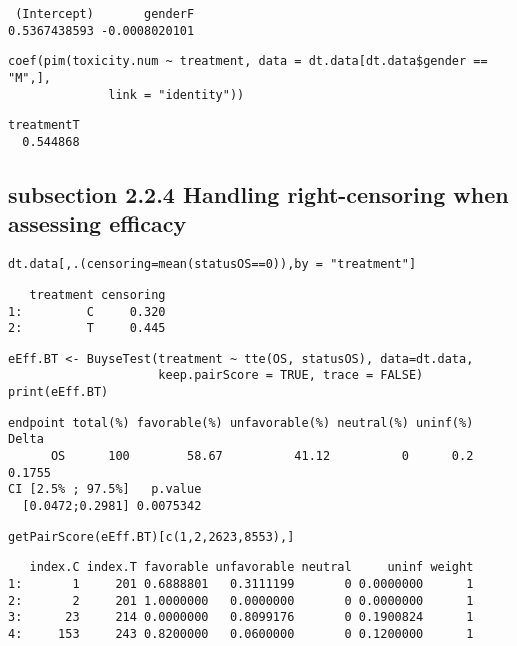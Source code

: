 \documentclass[12pt]{article}
\begin{document}
\begin{verbatim}
 (Intercept)       genderF 
0.5367438593 -0.0008020101
\end{verbatim}


\lstset{language=r,label= ,caption= ,captionpos=b,numbers=none}
\begin{lstlisting}
coef(pim(toxicity.num ~ treatment, data = dt.data[dt.data$gender == "M",],
              link = "identity"))
\end{lstlisting}

\begin{verbatim}
treatmentT 
  0.544868
\end{verbatim}

\subsection{subsection 2.2.4 Handling right-censoring when assessing efficacy}
\label{sec:org2a907b1}

\lstset{language=r,label= ,caption= ,captionpos=b,numbers=none}
\begin{lstlisting}
dt.data[,.(censoring=mean(statusOS==0)),by = "treatment"]
\end{lstlisting}

\begin{verbatim}
   treatment censoring
1:         C     0.320
2:         T     0.445
\end{verbatim}


\lstset{language=r,label= ,caption= ,captionpos=b,numbers=none}
\begin{lstlisting}
eEff.BT <- BuyseTest(treatment ~ tte(OS, statusOS), data=dt.data,
                     keep.pairScore = TRUE, trace = FALSE)
print(eEff.BT)
\end{lstlisting}

\begin{verbatim}
endpoint total(%) favorable(%) unfavorable(%) neutral(%) uninf(%)  Delta
      OS      100        58.67          41.12          0      0.2 0.1755
CI [2.5% ; 97.5%]   p.value
  [0.0472;0.2981] 0.0075342
\end{verbatim}


\lstset{language=r,label= ,caption= ,captionpos=b,numbers=none}
\begin{lstlisting}
getPairScore(eEff.BT)[c(1,2,2623,8553),]
\end{lstlisting}

\begin{verbatim}
   index.C index.T favorable unfavorable neutral     uninf weight
1:       1     201 0.6888801   0.3111199       0 0.0000000      1
2:       2     201 1.0000000   0.0000000       0 0.0000000      1
3:      23     214 0.0000000   0.8099176       0 0.1900824      1
4:     153     243 0.8200000   0.0600000       0 0.1200000      1
\end{verbatim}
\end{document}
